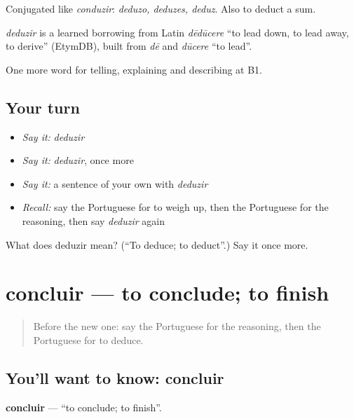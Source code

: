 Conjugated like \emph{conduzir}: \emph{deduzo, deduzes, deduz}. Also to deduct a sum.

\begin{cousinweb}
\emph{deduzir} is a learned borrowing from Latin \emph{dēdūcere} \textquotedblleft{}to lead down, to lead away, to derive\textquotedblright{} (EtymDB), built from \emph{dē} and \emph{dūcere} \textquotedblleft{}to lead\textquotedblright{}.
\end{cousinweb}

\begin{grammarlens}[title={What you've built}]
One more word for telling, explaining and describing at B1.
\end{grammarlens}

\subsection*{Your turn}
\begin{itemize}
\raggedright
  \item \emph{Say it:} \emph{deduzir}
  \item \emph{Say it:} \emph{deduzir}, once more
  \item \emph{Say it:} a sentence of your own with \emph{deduzir}
  \item \emph{Recall:} say the Portuguese for to weigh up, then the Portuguese for the reasoning, then say \emph{deduzir} again
\end{itemize}

\begin{tcolorbox}[breakable,colback=teal!4,colframe=teal!35!black,title={Before you move on}]
What does deduzir mean? (\textquotedblleft{}To deduce; to deduct\textquotedblright{}.) Say it once more.
\end{tcolorbox}
\section[concluir]{concluir — to conclude; to finish}

\label{lesson:PT-C346-concluir}



\begin{quote}
Before the new one: say the Portuguese for the reasoning, then the Portuguese for to deduce.
\end{quote}

\subsection*{You'll want to know: concluir}
\textbf{concluir} — \textquotedblleft{}to conclude; to finish\textquotedblright{}.

